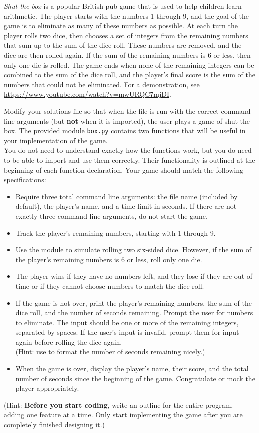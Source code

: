 \begin{problem} %
\emph{Shut the box} is a popular British pub game that is used to help children learn arithmetic.
The player starts with the numbers 1 through 9, and the goal of the game is to eliminate as many of these numbers as possible.
At each turn the player rolls two dice, then chooses a set of integers from the remaining numbers that sum up to the sum of the dice roll.
These numbers are removed, and the dice are then rolled again.
If the sum of the remaining numbers is 6 or less, then only one die is rolled.
The game ends when none of the remaining integers can be combined to the sum of the dice roll, and the player's final score is the sum of the numbers that could not be eliminated.
For a demonstration, see \url{https://www.youtube.com/watch?v=mwURQC7mjDI}.

Modify your solutions file so that when the file is run with the correct command line arguments (but \textbf{not} when it is imported), the user plays a game of shut the box.
The provided module \texttt{box.py} contains two functions that will be useful in your implementation of the game. \\
You do not need to understand exactly how the functions work, but you do need to be able to import and use them correctly. Their functionality is outlined at the beginning of each function declaration.
Your game should match the following specifications:

\begin{itemize}
\item Require three total command line arguments: the file name (included by default), the player's name, and a time limit in seconds.
If there are not exactly three command line arguments, do not start the game.
\item Track the player's remaining numbers, starting with 1 through 9.
\item Use the  module to simulate rolling two six-sided dice.
However, if the sum of the player's remaining numbers is 6 or less, roll only one die.
\item The player wins if they have no numbers left, and they lose if they are out of time or if they cannot choose numbers to match the dice roll.
\item If the game is not over, print the player's remaining numbers, the sum of the dice roll, and the number of seconds remaining.
Prompt the user for numbers to eliminate.
The input should be one or more of the remaining integers, separated by spaces.
If the user's input is invalid, prompt them for input again before rolling the dice again.
\\(Hint: use  to format the number of seconds remaining nicely.)
\item When the game is over, display the player's name, their score, and the total number of seconds since the beginning of the game.
Congratulate or mock the player appropriately.
\end{itemize}
(Hint: \textbf{Before you start coding}, write an outline for the entire program, adding one feature at a time.
Only start implementing the game after you are completely finished designing it.)


\end{problem}
